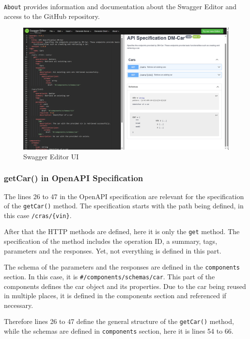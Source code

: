 \texttt{About} provides information and documentation about the Swagger Editor and access to the GitHub repository.

\begin{figure}
    \centering
    \includegraphics[width=\textwidth]{figures/microservices/dmCar/ms_dmCar_swaggerEditorUI.png}
    \caption{Swagger Editor UI}
    \label{fig:ms_dmCar_swaggerEditorUI}
\end{figure}

\subsubsection*{getCar() in OpenAPI Specification}
The lines 26 to 47 in the OpenAPI specification are relevant for the specification of the \texttt{getCar()} method.
The specification starts with the path being defined, in this case \texttt{/cras/\{vin\}}.

After that the HTTP methods are defined, here it is only the \texttt{get} method.
The specification of the method includes the operation ID, a summary, tags, parameters and the responses.
Yet, not everything is defined in this part.

The schema of the parameters and the responses are defined in the \texttt{components} section.
In this case, it is \texttt{\#/components/schemas/car}.
This part of the components defines the car object and its properties.
Due to the car being reused in multiple places, it is defined in the components section and referenced if necessary.

Therefore lines 26 to 47 define the general structure of the \texttt{getCar()} method, while the schemas are defined in \texttt{components} section, here it is lines 54 to 66.
